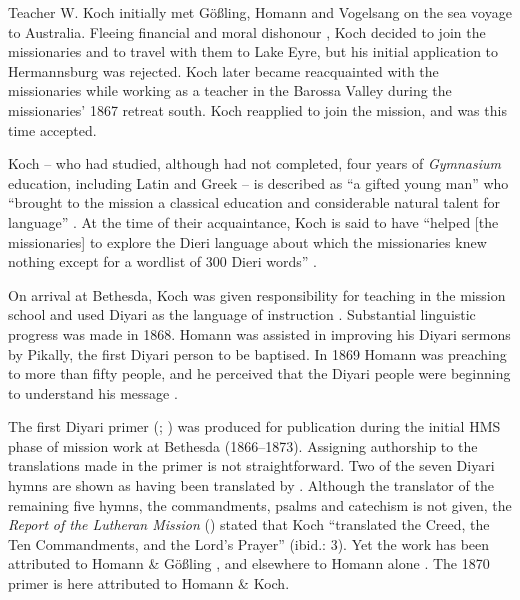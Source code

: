 Teacher W. Koch initially met Gößling, Homann and Vogelsang on the sea voyage to Australia. Fleeing financial and moral dishonour \citep[89--90]{kneebone_teichelmann_2005}, Koch decided to join the missionaries and to travel with them to Lake Eyre, but his initial application to Hermannsburg was rejected. Koch later became reacquainted with the missionaries while working as a teacher in the Barossa Valley during the missionaries' 1867 retreat south. Koch reapplied to join the mission, and was this time accepted.

Koch -- who had studied, although had not completed, four years of \textit{Gymnasium} education, including Latin and Greek -- is described as “a gifted young man” \citep[187]{hebart_united_1938} who “brought to the mission a classical education and considerable natural talent for language” \citep[10]{kneebone_teichelmann_2005}. At the time of their acquaintance, Koch is said to have “helped [the missionaries] to explore the Dieri language about which the missionaries knew nothing except for a wordlist of 300 Dieri words” \citep{ganter_hermannsburg_2016}.

On arrival at Bethesda, Koch was given responsibility for teaching in the mission school and used Diyari as the language of instruction \citep[51]{harms_traume_2003}. Substantial linguistic progress was made in 1868. Homann was assisted in improving his Diyari sermons by Pikally, the first Diyari person to be baptised. In 1869 Homann was preaching to more than fifty people, and he perceived that the Diyari people were beginning to understand his message \citep[52]{harms_traume_2003}.

\largerpage
The first Diyari primer (\citealt{koch_nujanujarajinkiniexa_1870}; ) was produced for publication during the initial HMS phase of mission work at Bethesda (1866--1873). Assigning authorship to the translations made in the primer is not straightforward. Two of the seven Diyari hymns are shown as having been translated by \citet[26]{koch_nujanujarajinkiniexa_1870}. Although the translator of the remaining five hymns, the commandments, psalms and catechism is not given, the \textit{Report} \textit{of the Lutheran Mission} (\citeyear{koch_untitled_1868}) stated that Koch “translated the Creed, the Ten Commandments, and the Lord’s Prayer” (ibid.: 3). Yet the work has been attributed to Homann \& Gößling \citep[100]{graetz_open_1988}, and elsewhere to Homann alone \citep[59]{harms_traume_2003}. The 1870 primer is here attributed to Homann \& Koch.



